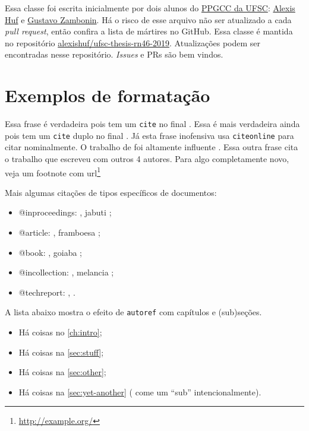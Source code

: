 \documentclass[]{ufsc-thesis-rn46-2019}
\begin{document}
Essa classe foi escrita inicialmente por dois alunos do
\href{http://ppgcc.posgrad.ufsc.br/}{PPGCC da UFSC}:
\href{mailto:alexishuf@gmail.com}{Alexis Huf} e
\href{mailto:gustavo.zambonin@posgrad.ufsc.br}{Gustavo Zambonin}.  
Há o risco de esse arquivo não ser atualizado a cada \textit{pull request},
então confira a lista de mártires no GitHub. Essa classe é mantida no
repositório
\href{https://github.com/alexishuf/ufsc-thesis-rn46-2019/}{alexishuf/ufsc-thesis-rn46-2019}.
Atualizações podem ser encontradas nesse repositório. \textit{Issues} e PRs são
bem vindos.

\section{Exemplos de formatação}
\label{sec:ex}

Essa frase é verdadeira pois tem um \texttt{cite} no final \cite{turing1937}. Essa
é mais verdadeira ainda pois tem um  \texttt{cite} duplo no
final \cite{turing1937,dijkstra1968}. Já esta frase inofensiva usa
 \texttt{citeonline} para citar 
nominalmente. O trabalho de  foi altamente influente
\cite{diffie1976}. Essa outra frase cita o trabalho que 
escreveu com outros 4 autores. Para algo completamente novo, veja um footnote
com url\footnote{\url{http://example.org/}}

Mais algumas citações de tipos específicos de documentos:
\begin{itemize}
\item @inproceedings: , jabuti
  \cite{Ullman1989magic};
\item @article: , framboesa \cite{Distefano2019};
\item @book: , goiaba \cite{Abiteboul1995};
\item @incollection: , melancia \cite{Forgy1989};
\item @techreport: ,  \cite{rdf11}.
\end{itemize}

A lista abaixo mostra o efeito de  \texttt{autoref} com capítulos e (sub)seções.

\begin{itemize}
\item Há coisas no \autoref{ch:intro};
\item Há coisas na \autoref{sec:stuff};
\item Há coisas na \autoref{sec:other};
\item Há coisas na \autoref{sec:yet-another} (\abnTeX{} come um ``sub'' intencionalmente).
\end{itemize}
\end{document}
